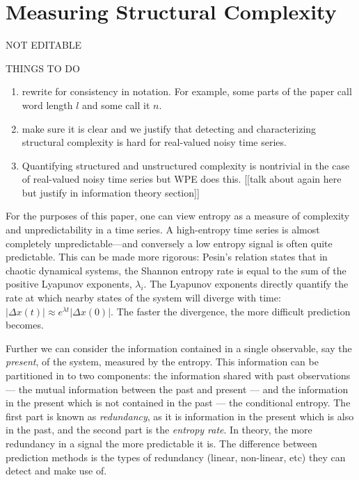 \section{Measuring Structural Complexity }\label{sec:meaComplex}
{\color{red} NOT EDITABLE}

THINGS TO DO
\begin{enumerate}
\item rewrite for consistency in notation. For example, some parts of the paper call word length $l$ and some call it $n$.

\item make sure it is clear and we justify that detecting and characterizing structural complexity is hard for real-valued noisy time series.
\item Quantifying structured and unstructured complexity is nontrivial in the case of real-valued noisy time series but WPE does this. [[talk about again here but justify in information theory section]]

\end{enumerate}


For the purposes of this paper, one can view entropy as a measure of complexity and unpredictability in a time series.  A high-entropy time series is almost completely unpredictable---and conversely a low entropy signal is often quite predictable.  This can be made more rigorous: Pesin's relation \cite{pesin77} states that in chaotic dynamical systems, the Shannon entropy rate is equal to the sum of the positive Lyapunov exponents, $\lambda_i$. The Lyapunov exponents directly quantify the rate at which nearby states of the system will diverge with time: $\left| \Delta x(t) \right| \approx e^{\lambda t} \left| \Delta x(0) \right|$.  The faster the divergence, the more difficult prediction becomes.

Further we can consider the information contained in a single observable, say the \emph{present}, of the system, measured by the entropy. This information can be partitioned in to two components: the information shared with past observations --- the mutual information between the past and present --- and the information in the present which is not contained in the past --- the conditional entropy. The first part is known as \emph{redundancy}, as it is information in the present which is also in the past, and the second part is the \emph{entropy rate}. In theory, the more redundancy in a signal the more predictable it is. The difference between prediction methods is the types of redundancy (linear, non-linear, etc) they can detect and make use of.

